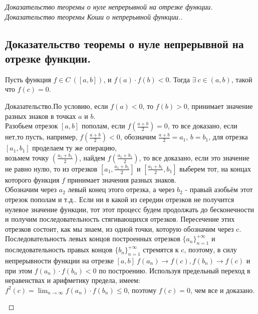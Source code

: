 
\label{sec_Proofs01}
\begin{proof}[Доказательство теоремы о нуле непрерывной на отрезке функции. Доказательство теоремы Коши о непрерывной функции.]
    \subsection*{Доказательство теоремы о нуле непрерывной на отрезке функции.}
    \begin{note}[amber]
        Пусть функция $f \in C \ ([a, b])$, и $f(a) \cdot f(b) < 0$. Тогда $ \exists \ c \in (a, b)$, такой что $f(c) = 0$. \\
        \begin{note}[purple]
            Доказательство.По условию, если $f(a) < 0$, то $f(b) > 0$, принимает значение разных знаков в точках $a$ и $b$. \\
            Разобьем отрезок $[a, b]$ пополам, если $f(\frac{a + b}{2}) = 0$, то все доказано, если нет,то пусть, например, $f(\frac{a + b}{2}) < 0$, обозначим $\frac{a + b}{2} = a_{1}$, $b = b_{1}$, для отрезка $[a_{1}, b_{1}]$ проделаем ту же операцию, \\
            возьмем точку $(\frac{a_{1} + b_{1}}{2})$, найдем $f(\frac{a_{1} + b_{1}}{2})$, то все доказано, если это значение не равно нулю, то из отрезков $[a_{1}, \frac{a_{1} + b_{1}}{2}]$ и $[\frac{a_{1} + b_{1}}{2}, b_{1}]$ выберем тот, на концах которого функция $f$ принимает значения разных знаков. \\
            Обозначим через $a_{2}$ левый конец этого отрезка, а через $b_{2}$ - правый азобьём этот отрезок
            пополам и т.д.. Если ни в какой из середин отрезков не получится нулевое значение функции, тот этот процесс будем продолжать до бесконечности и получим последовательность
            стягивающихся отрезков. Пересечение этих отрезков состоит, как мы знаем, из одной точки, которую обозначим через c. Последовательность левых концов построенных отрезков $\{a_n\}^{+\infty}_{n = 1}$ и последовательность правых концов $\{b_n\}^{+\infty}_{n = 1}$ стремятся к c,
            поэтому, в силу непрерывности функции на отрезке $[a, b] \ f (a_n) \rightarrow f(c), f(b_n) \rightarrow f(c)$ и при этом $f(a_n) \cdot f(b_n) < 0$ по построению. Используя предельный переход в неравенствах и арифметику предела,
            имеем: $f^2(c) = \displaystyle{}\lim_{n \to \infty} f(a_n) \cdot f(b_n) \leq 0$, поэтому $f(c) = 0$, чем все и доказано. 
        \end{note}
    \end{note}


\end{proof}
